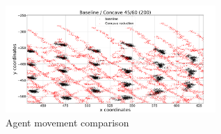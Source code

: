 \documentclass[preprint,12pt]{elsarticle}
\begin{document}
\begin{figure}
\begin{center}
\includegraphics[width=8cm]{figures/SwarmCoverage4560-2}
\end{center}
\caption{Agent movement comparison\label{voids:SwarmCoverage4560-2}}
\end{figure}
\end{document}
